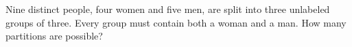 Nine distinct people, four women and five men, are split into three unlabeled groups of three. Every group must contain both a woman and a man. How many partitions are possible?
